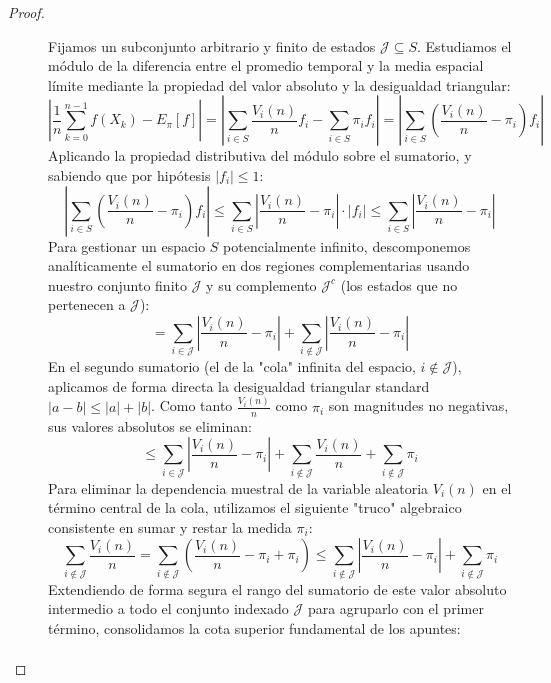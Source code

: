 \begin{coro}
\begin{proof}
\begin{description}
    \item[] Fijamos un subconjunto arbitrario y finito de estados $\mathcal{J} \subseteq S$. Estudiamos el módulo de la diferencia entre el promedio temporal y la media espacial límite mediante la propiedad del valor absoluto y la desigualdad triangular:
        \[
        \left| \frac{1}{n} \sum_{k=0}^{n-1} f(X_k) - E_{\pi}[f] \right| = \left| \sum_{i \in S} \frac{V_i(n)}{n} f_i - \sum_{i \in S} \pi_i f_i \right| = \left| \sum_{i \in S} \left( \frac{V_i(n)}{n} - \pi_i \right) f_i \right|
        \]
        Aplicando la propiedad distributiva del módulo sobre el sumatorio, y sabiendo que por hipótesis $|f_i| \le 1$:
        \[
        \left| \sum_{i \in S} \left( \frac{V_i(n)}{n} - \pi_i \right) f_i \right| \le \sum_{i \in S} \left| \frac{V_i(n)}{n} - \pi_i \right| \cdot |f_i| \le \sum_{i \in S} \left| \frac{V_i(n)}{n} - \pi_i \right|
        \]
        Para gestionar un espacio $S$ potencialmente infinito, descomponemos analíticamente el sumatorio en dos regiones complementarias usando nuestro conjunto finito $\mathcal{J}$ y su complemento $\mathcal{J}^c$ (los estados que no pertenecen a $\mathcal{J}$):
        \[
        = \sum_{i \in \mathcal{J}} \left| \frac{V_i(n)}{n} - \pi_i \right| + \sum_{i \notin \mathcal{J}} \left| \frac{V_i(n)}{n} - \pi_i \right|
        \]
        En el segundo sumatorio (el de la "cola" infinita del espacio, $i \notin \mathcal{J}$), aplicamos de forma directa la desigualdad triangular standard $|a - b| \le |a| + |b|$. Como tanto $\frac{V_i(n)}{n}$ como $\pi_i$ son magnitudes no negativas, sus valores absolutos se eliminan:
        \[
        \le \sum_{i \in \mathcal{J}} \left| \frac{V_i(n)}{n} - \pi_i \right| + \sum_{i \notin \mathcal{J}} \frac{V_i(n)}{n} + \sum_{i \notin \mathcal{J}} \pi_i
        \]
        Para eliminar la dependencia muestral de la variable aleatoria $V_i(n)$ en el término central de la cola, utilizamos el siguiente "truco" algebraico consistente en sumar y restar la medida $\pi_i$:
        \[
        \sum_{i \notin \mathcal{J}} \frac{V_i(n)}{n} = \sum_{i \notin \mathcal{J}} \left( \frac{V_i(n)}{n} - \pi_i + \pi_i \right) \le \sum_{i \notin \mathcal{J}} \left| \frac{V_i(n)}{n} - \pi_i \right| + \sum_{i \notin \mathcal{J}} \pi_i
        \]
        Extendiendo de forma segura el rango del sumatorio de este valor absoluto intermedio a todo el conjunto indexado $\mathcal{J}$ para agruparlo con el primer término, consolidamos la cota superior fundamental de los apuntes:
        \begin{align*}

\end{align*}
\end{description}
\end{proof}
\end{coro}
